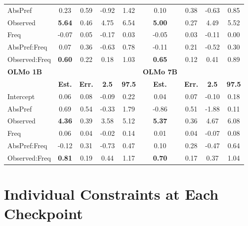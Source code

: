 \documentclass[
  12pt,
  letterpaper,
]{scrreprt}
\begin{document}
\begin{table}
{\begin{tabular}{l|cccc|cccc}
         AbsPref & 0.23 & 0.59 & -0.92 & 1.42 & 0.10 & 0.38 & -0.63 & 0.85  \\
         Observed & \textbf{5.64} & 0.46 & 4.75 & 6.54 & \textbf{5.00} & 0.27 & 4.49 & 5.52 \\
         Freq & -0.07 & 0.05 & -0.17 & 0.03 & -0.05 & 0.03 & -0.11 & 0.00  \\
         AbsPref:Freq & 0.07 & 0.36 & -0.63 & 0.78 & -0.11 & 0.21 & -0.52 & 0.30 \\
         Observed:Freq & \textbf{0.60} & 0.22 & 0.18 & 1.03 & \textbf{0.65} & 0.12 & 0.41 & 0.89 \\
         \hline
          \textbf{OLMo 1B} & & & & & \textbf{OLMo 7B}\\
        \hline
         & \textbf{Est.} & \textbf{Err.} & \textbf{2.5} & \textbf{97.5} & \textbf{Est.} & \textbf{Err.} & \textbf{2.5} & \textbf{97.5} \\
         \hline
         Intercept & 0.06 & 0.08 & -0.09 & 0.22 & 0.04 & 0.07 & -0.10 & 0.18 \\
         AbsPref & 0.69 & 0.54 & -0.33 & 1.79 & -0.86 & 0.51 & -1.88 & 0.11\\
         Observed & \textbf{4.36} & 0.39 & 3.58 & 5.12 & \textbf{5.37} & 0.36 & 4.67 & 6.08 \\
         Freq & 0.06 & 0.04 & -0.02 & 0.14 & 0.01 & 0.04 & -0.07 & 0.08 \\
         AbsPref:Freq & -0.12 & 0.31 & -0.73 & 0.47 & 0.10 & 0.28 & -0.47 & 0.64 \\
         Observed:Freq & \textbf{0.81} & 0.19 & 0.44 & 1.17 & \textbf{0.70} & 0.17 & 0.37 & 1.04  \\
         \hline
    \end{tabular}

}

\end{table}%

\chapter{Individual Constraints at Each
Checkpoint}\label{sec-individual-constraints-at-each-checkpoint}
\end{document}
